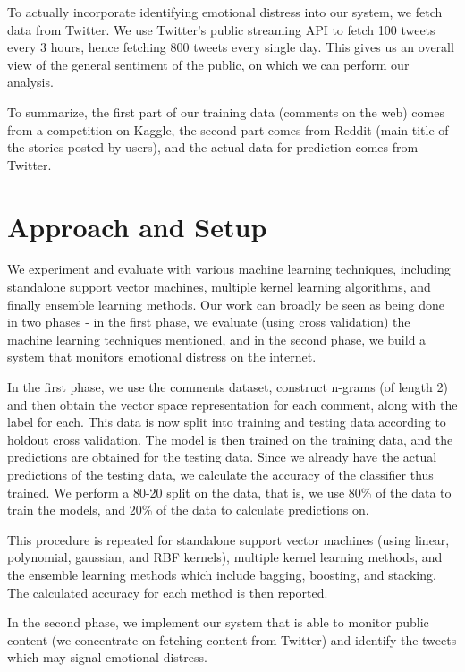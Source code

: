 To actually incorporate identifying emotional distress into our system, we fetch data from Twitter. We use Twitter's public streaming API \cite{twitter_streaming_api} to fetch 100 tweets every 3 hours, hence fetching 800 tweets every single day. This gives us an overall view of the general sentiment of the public, on which we can perform our analysis.

To summarize, the first part of our training data (comments on the web) comes from a competition on Kaggle, the second part comes from Reddit (main title of the stories posted by users), and the actual data for prediction comes from Twitter.

\section{Approach and Setup}
We experiment and evaluate with various machine learning techniques, including standalone support vector machines, multiple kernel learning algorithms, and finally ensemble learning methods. Our work can broadly be seen as being done in two phases - in the first phase, we evaluate (using cross validation) the machine learning techniques mentioned, and in the second phase, we build a system that monitors emotional distress on the internet.

In the first phase, we use the comments \cite{kaggle} dataset, construct n-grams (of length 2) and then obtain the vector space representation for each comment, along with the label for each. This data is now split into training and testing data according to holdout cross validation. The model is then trained on the training data, and the predictions are obtained for the testing data. Since we already have the actual predictions of the testing data, we calculate the accuracy of the classifier thus trained. We perform a 80-20 split on the data, that is, we use 80\% of the data to train the models, and 20\% of the data to calculate predictions on.

This procedure is repeated for standalone support vector machines (using linear, polynomial, gaussian, and RBF kernels), multiple kernel learning methods, and the ensemble learning methods which include bagging, boosting, and stacking. The calculated accuracy for each method is then reported.

In the second phase, we implement our system that is able to monitor public content (we concentrate on fetching content from Twitter) and identify the tweets which may signal emotional distress.

